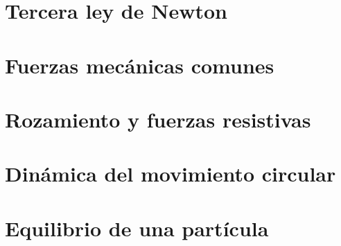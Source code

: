 ﻿\documentclass[11pt,letterpaper,openany]{book}
\newcommand{\rutaraiz}{../..}
\begin{document}

\chapter{Tercera ley de Newton}





\chapter{Fuerzas mecánicas comunes}





\chapter{Rozamiento y fuerzas resistivas}





\chapter{Dinámica del movimiento circular}





\chapter{Equilibrio de una partícula}
\end{document}

